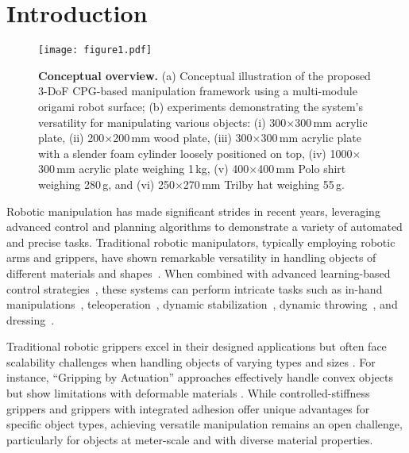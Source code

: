 \section{Introduction}
\label{sec:intro}

\begin{figure}[t]
    \centering
    \texttt{[image: figure1.pdf]}
    \caption{\textbf{Conceptual overview.} 
    (a) Conceptual illustration of the proposed 3-DoF CPG-based manipulation framework using a multi-module origami robot surface;
    (b) experiments demonstrating the system's versatility for manipulating various objects: 
    (i) 300$\times$300\,mm acrylic plate, 
    (ii) 200$\times$200\,mm wood plate, 
    (iii) 300$\times$300\,mm acrylic plate with a slender foam cylinder loosely positioned on top,
    (iv) 1000$\times$300\,mm acrylic plate weighing 1\,kg, 
    (v) 400$\times$400\,mm Polo shirt weighing 280\,g, and
    (vi) 250$\times$270\,mm Trilby hat weighing 55\,g.
    }
    \label{fig:concept}
\end{figure}


Robotic manipulation has made significant strides in recent years, leveraging advanced control and planning algorithms to demonstrate a variety of automated and precise tasks. Traditional robotic manipulators, typically employing robotic arms and grippers, have shown remarkable versatility in handling objects of different materials and shapes~\cite{shintake_versatile_2016, shintake_soft_2018, khurana_motion_2024}. When combined with advanced learning-based control strategies~\cite{cui_toward_2021}, these systems can perform intricate tasks such as in-hand manipulations~\cite{abondance_dexterous_2020, andrychowicz_learning_2020, liu_modeling_2020}, teleoperation~\cite{aldaco_aloha_nodate, 10035484}, dynamic stabilization~\cite{9811752}, dynamic throwing~\cite{liu_tube_2024}, and dressing~\cite{zhang_learning_2022}.

Traditional robotic grippers excel in their designed applications but often face scalability challenges when handling objects of varying types and sizes \cite{shintake2018soft}. For instance, ``Gripping by Actuation'' approaches effectively handle convex objects but show limitations with deformable materials \cite{crooks2016fin, crooks2017passive}. While controlled-stiffness grippers \cite{6225373,7086317} and grippers with integrated adhesion \cite{shintake2016,hawkes2015grasping} offer unique advantages for specific object types, achieving versatile manipulation remains an open challenge, particularly for objects at meter-scale and with diverse material properties.

